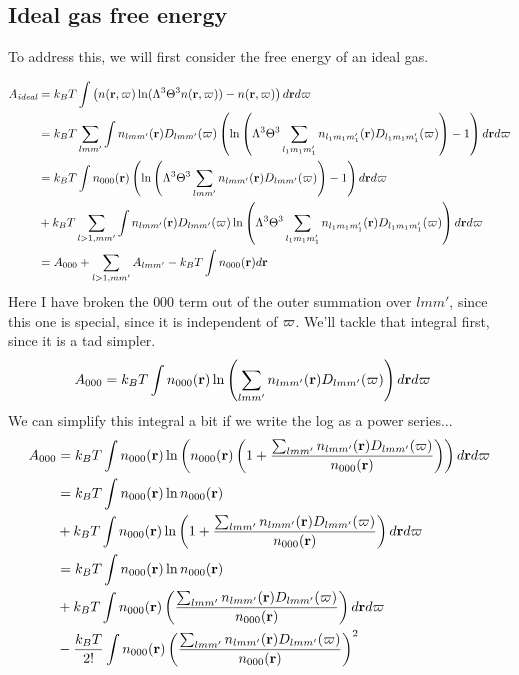 \documentclass[letterpaper,twocolumn,amsmath,amssymb,pre]{revtex4-1}
\begin{document}
\subsection{Ideal gas free energy}
To address this, we will
first consider the free energy of an ideal gas.
\begin{widetext}
\begin{align}
  A_{\textit{ideal}} &=
  k_BT \int
  \left(n(\mathbf{r},\mathbf{\varpi})\ln(\Lambda^3\Theta^3 n(\mathbf{r},\mathbf{\varpi})) - n(\mathbf{r},\mathbf{\varpi})
  \right) d\mathbf{r} d\mathbf{\varpi}
  \\
  &=
  k_BT \sum_{lmm'} \int
  n_{lmm'}(\mathbf{r})D_{lmm'}(\mathbf{\varpi})\left(
  \ln\left(\Lambda^3\Theta^3 \sum_{l_1m_1m'_1} n_{l_1m_1m'_1}(\mathbf{r})D_{l_1m_1m'_1}(\mathbf{\varpi})\right) - 1
  \right) d\mathbf{r} d\mathbf{\varpi}
  \\
  &=
  k_BT \int n_{000}(\mathbf{r})
  \left(\ln\left(\Lambda^3\Theta^3 \sum_{lmm'} n_{lmm'}(\mathbf{r})D_{lmm'}(\mathbf{\varpi})\right) - 1
  \right) d\mathbf{r} d\mathbf{\varpi}
  \\&+
  k_BT \sum_{l>1,mm'} \int
  n_{lmm'}(\mathbf{r})D_{lmm'}(\mathbf{\varpi})
  \ln\left(\Lambda^3\Theta^3 \sum_{l_1m_1m'_1} n_{l_1m_1m'_1}(\mathbf{r})D_{l_1m_1m'_1}(\mathbf{\varpi})\right)
  d\mathbf{r} d\mathbf{\varpi}
  \\
  &= A_{000} + \sum_{l>1,mm'} A_{lmm'} - k_BT\int n_{000}(\mathbf{r})d\mathbf{r}
\end{align}
Here I have broken the $000$ term out of the outer summation over
$lmm'$, since this one is special, since it is independent of $\mathbf{\varpi}$.
We'll tackle that integral first, since it is a tad simpler.
\begin{align}
  A_{000} &= k_BT\int
  n_{000}(\mathbf{r})\ln\left(
  \sum_{lmm'} n_{lmm'}(\mathbf{r})D_{lmm'}(\mathbf{\varpi})
  \right)
  d\mathbf{r} d\mathbf{\varpi}
\end{align}
We can simplify this integral a bit if we write the log as a power
series...
\begin{align}
  A_{000}
  &= k_BT\int
  n_{000}(\rr)\ln\left(
  n_{000}(\rr)\left(1 + \frac{\sum_{lmm'} n_{lmm'}(\rr)D_{lmm'}(\rot)}{n_{000}(\rr)}\right)
  \right)
  d\rr d\rot
  \\
  &= k_BT\int
  n_{000}(\rr)\ln n_{000}(\rr)
  \\&+k_BT\int
  n_{000}(\rr)\ln\left(1 + \frac{\sum_{lmm'} n_{lmm'}(\rr)D_{lmm'}(\rot)}{n_{000}(\rr)}\right)
  d\rr d\rot
  \\
  &= k_BT\int
  n_{000}(\rr)\ln n_{000}(\rr)
  \\&+k_BT\int
  n_{000}(\rr)\left(\frac{\sum_{lmm'} n_{lmm'}(\rr)D_{lmm'}(\rot)}{n_{000}(\rr)}\right)
  d\rr d\rot
  \\&-\frac{k_BT}{2!}\int
  n_{000}(\rr)\left(\frac{\sum_{lmm'} n_{lmm'}(\rr)D_{lmm'}(\rot)}{n_{000}(\rr)}\right)^2

\end{align}
\end{widetext}
\end{document}
